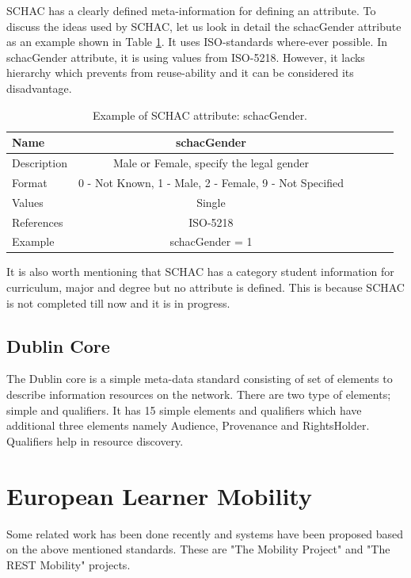 \documentclass[12pt,a4paper,oneside]{book}
\begin{document}
	SCHAC has a clearly defined meta-information for defining an attribute. To discuss the ideas  used by SCHAC, let us look in detail the schacGender attribute as an example shown in Table \ref{tab:schacGender}. It uses ISO-standards where-ever possible. In schacGender attribute, it is using values from ISO-5218. However, it lacks hierarchy which prevents from reuse-ability and it can be considered its disadvantage. \\
	
\begin{table}[!tbh]
\caption{Example of SCHAC attribute: schacGender.}
\label{tab:schacGender}
\centering
\begin{tabular}[width=\columnwidth]{|p{1.3in}|c|c|c|c|c|}
\hline
Name               	& schacGender \\
\hline
Description 	    & Male or Female, specify the legal gender	\\
Format	    		& 0 - Not Known, 1 - Male, 2 - Female, 9 - Not Specified \\
Values				& Single \\
References	        & ISO-5218	\\
Example	            & schacGender = 1	\\
\hline
\end{tabular}
\end{table}

It is also worth mentioning that SCHAC has a category student information for curriculum, major and degree but no attribute is defined. This is because SCHAC is not completed till now and it is in progress. \\

    \subsection{Dublin Core}
    The Dublin core is a simple meta-data standard consisting of set of elements to describe information resources on the network. There are two type of elements; simple and qualifiers. It has 15 simple elements and qualifiers which have additional three elements namely Audience, Provenance and RightsHolder. Qualifiers help in resource discovery. \\

\section{European Learner Mobility}
Some related work has been done recently and systems have been proposed based on the above mentioned standards. These are "The Mobility Project" and "The REST Mobility" projects. \\
\end{document}
